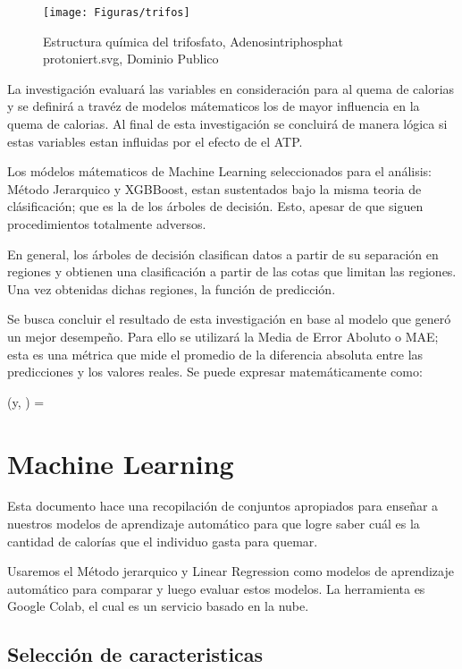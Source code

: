 \documentclass[5p,times,authoryear]{sciarticle}
\begin{document}
\begin{multicols}{2}
\begin{figure}[H]
\centering
  \texttt{[image: Figuras/trifos]}\\
  \caption{Estructura química del trifosfato, Adenosintriphosphat protoniert.svg, Dominio Publico}\label{fig1}
\end{figure}

La investigación evaluará las variables en consideración para al quema de calorias y se definirá a travéz de modelos mátematicos los de mayor influencia en la quema de calorias. Al final de esta investigación se concluirá de manera lógica si estas variables estan influidas por el efecto de el ATP.

Los módelos mátematicos de Machine Learning seleccionados para el análisis: Método Jerarquico y XGBBoost, estan sustentados bajo la misma teoria de clásificación; que es la de los árboles de decisión. Esto, apesar de que siguen procedimientos totalmente adversos.

En general, los árboles de decisión clasifican datos a partir de su separación en regiones y obtienen una clasificación a partir de las cotas que limitan las regiones. Una vez obtenidas dichas regiones, la función de predicción.

Se busca concluir el resultado de esta investigación en base al modelo que generó un mejor desempeño. Para ello se utilizará la Media de Error Aboluto o MAE; esta es una métrica que mide el promedio de la diferencia absoluta entre las predicciones y los valores reales. 
Se puede expresar matemáticamente como:

(y, ) = 


\section{Machine Learning}
Esta documento hace una recopilación de conjuntos apropiados para enseñar a nuestros modelos de aprendizaje automático para que logre saber cuál es la cantidad de calorías que el individuo gasta para quemar. 

Usaremos el Método jerarquico y Linear Regression como modelos de aprendizaje automático para comparar y luego evaluar estos modelos. La herramienta es Google Colab, el cual es un servicio basado en la nube.

\subsection{Selección de caracteristicas}\\


\end{multicols}
\end{document}
